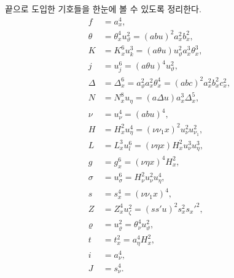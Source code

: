 
끝으로 도입한 기호들을 한눈에 볼 수 있도록 정리한다.
\begin{align*}
f&=a_x^4,\\
\theta&=\theta_x^4u_\vartheta^2=(abu)^2a_x^2b_x^2,\\
K&=K_x^6u_k^3=(a\theta u)u_\vartheta^2a_x^3\theta_x^3,\\
j&=u_j^6=(a\theta u)^4u_\vartheta^2,\\
\Delta&=\Delta_x^6=a_\vartheta^2a_x^2\theta_x^4=(abc)^2a_x^2b_x^2c_x^2,\\
N&=N_x^8u_\eta=(a\Delta u)a_x^3\Delta_x^5,\\
\nu&=u_\nu^4=(abu)^4,\\
H&=H_x^2u_\eta^4=(\nu\nu_1x)^2u_\nu^2u_{\nu_1}^2,\\
L&=L_x^3u_l^6=(\nu\eta x)H_x^2u_\nu^3u_\eta^3,\\
g&=g_x^6=(\nu\eta x)^4H_x^2,\\
\sigma&=u_\sigma^6=H_\nu^2u_\nu^2u_\eta^4,\\
s&=s_x^4=(\nu\nu_1x)^4,\\
Z&=Z_x^4u_\zeta^2=(ss'u)^2s_x^2s_x'^2,\\
\varrho&=u_\varrho^2=\theta_\nu^4u_\vartheta^2,\\
t&=t_x^2=a_\eta^4H_x^2,\\
i&=a_\nu^4,\\
J&=s_\nu^4.
\end{align*}
